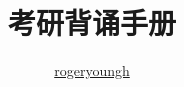 \documentclass{purebook}
\title{考研背诵手册}
\author{\href{https://github.com/rogeryoungh}{rogeryoungh}}
\begin{document}
\newcommand{\ee}{\mathrm{e}}
\newcommand{\eps}{\varepsilon}
\newcommand{\vbf}[1]{\boldsymbol{#1}}
\newcommand{\seq}[2]{#1_1,\cdots,#1_#2}

\newcommand{\arcsinh}{\operatorname{arcsinh}}
\newcommand{\arccosh}{\operatorname{arccosh}}
\newcommand{\arctanh}{\operatorname{arctanh}}

\maketitle

\frontmatter

\tableofcontents

\mainmatter

\end{document}
